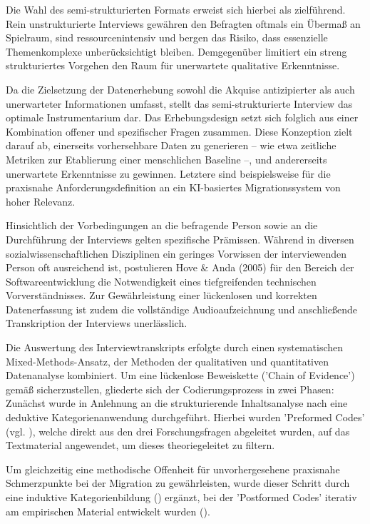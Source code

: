 Die Wahl des semi-strukturierten Formats erweist sich hierbei als zielführend. Rein unstrukturierte Interviews gewähren den Befragten oftmals ein Übermaß an Spielraum, sind ressourcenintensiv und bergen das Risiko, dass essenzielle Themenkomplexe unberücksichtigt bleiben. Demgegenüber limitiert ein streng strukturiertes Vorgehen den Raum für unerwartete qualitative Erkenntnisse. \parencite{seamanQualitativeMethodsEmpirical1999}

Da die Zielsetzung der Datenerhebung sowohl die Akquise antizipierter als auch unerwarteter Informationen umfasst, stellt das semi-strukturierte Interview das optimale Instrumentarium dar. Das Erhebungsdesign setzt sich folglich aus einer Kombination offener und spezifischer Fragen zusammen. Diese Konzeption zielt darauf ab, einerseits vorhersehbare Daten zu generieren – wie etwa zeitliche Metriken zur Etablierung einer menschlichen Baseline –, und andererseits unerwartete Erkenntnisse zu gewinnen. Letztere sind beispielsweise für die praxisnahe Anforderungsdefinition an ein KI-basiertes Migrationssystem von hoher Relevanz.

Hinsichtlich der Vorbedingungen an die befragende Person sowie an die Durchführung der Interviews gelten spezifische Prämissen. Während in diversen sozialwissenschaftlichen Disziplinen ein geringes Vorwissen der interviewenden Person oft ausreichend ist, postulieren Hove \& Anda (2005) für den Bereich der Softwareentwicklung die Notwendigkeit eines tiefgreifenden technischen Vorverständnisses. Zur Gewährleistung einer lückenlosen und korrekten Datenerfassung ist zudem die vollständige Audioaufzeichnung und anschließende Transkription der Interviews unerlässlich. \parencite{hoveExperiencesConductingSemistructured2005}

Die Auswertung des Interviewtranskripts erfolgte durch einen systematischen Mixed-Methods-Ansatz, der Methoden der qualitativen und quantitativen Datenanalyse kombiniert. Um eine lückenlose Beweiskette ('Chain of Evidence') gemäß \textcite{runesonGuidelinesConductingReporting2009} sicherzustellen, gliederte sich der Codierungsprozess in zwei Phasen: Zunächst wurde in Anlehnung an die strukturierende Inhaltsanalyse nach \textcite{mayringQualitativeContentAnalysis2014} eine deduktive Kategorienanwendung durchgeführt. Hierbei wurden 'Preformed Codes' (vgl. \textcite{seamanQualitativeMethodsEmpirical1999}), welche direkt aus den drei Forschungsfragen abgeleitet wurden, auf das Textmaterial angewendet, um dieses theoriegeleitet zu filtern.

Um gleichzeitig eine methodische Offenheit für unvorhergesehene praxisnahe Schmerzpunkte bei der Migration zu gewährleisten, wurde dieser Schritt durch eine induktive Kategorienbildung (\textcite{mayringQualitativeContentAnalysis2014}) ergänzt, bei der 'Postformed Codes' iterativ am empirischen Material entwickelt wurden (\textcite{seamanQualitativeMethodsEmpirical1999}).

